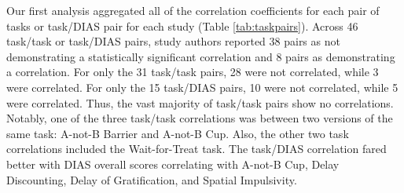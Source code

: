 \documentclass[
  ,pub,floatsintext]{apa6}
\begin{document}
Our first analysis aggregated all of the correlation coefficients for each pair of tasks or task/DIAS pair for each study (Table \ref{tab:taskpairs}). Across 46 task/task or task/DIAS pairs, study authors reported 38 pairs as not demonstrating a statistically significant correlation and 8 pairs as demonstrating a correlation. For only the 31 task/task pairs, 28 were not correlated, while 3 were correlated. For only the 15 task/DIAS pairs, 10 were not correlated, while 5 were correlated. Thus, the vast majority of task/task pairs show no correlations. Notably, one of the three task/task correlations was between two versions of the same task: A-not-B Barrier and A-not-B Cup. Also, the other two task correlations included the Wait-for-Treat task. The task/DIAS correlation fared better with DIAS overall scores correlating with A-not-B Cup, Delay Discounting, Delay of Gratification, and Spatial Impulsivity.
\end{document}
